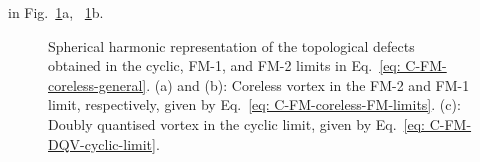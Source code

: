 in Fig.~\ref{fig: C-FM-coreless-initial-states}a,
~\ref{fig: C-FM-coreless-initial-states}b.
\begin{figure}
    \centering
    \caption[Spherical harmonic representation of a coreless vortex connection
        across a cyclic to ferromagnetic interface]
    {\label{fig: C-FM-coreless-initial-states}Spherical harmonic
        representation of the topological defects obtained in the cyclic, FM-1,
        and FM-2 limits in Eq.~\eqref{eq: C-FM-coreless-general}.
        (a) and (b): Coreless vortex in the FM-2 and FM-1 limit, respectively,
        given by Eq.~\eqref{eq: C-FM-coreless-FM-limits}.
        (c): Doubly quantised vortex in the cyclic limit, given by
        Eq.~\eqref{eq: C-FM-DQV-cyclic-limit}.}
\end{figure}
